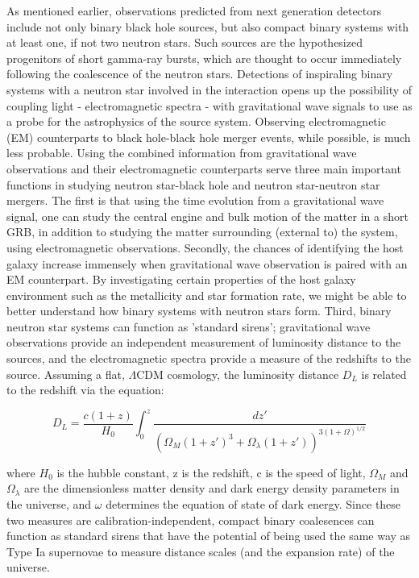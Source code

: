 \documentclass{article}
\begin{document}
As mentioned earlier, observations predicted from next generation detectors include not only binary black hole sources, but also compact binary systems with at least one, if not two neutron stars.  Such sources are the hypothesized progenitors of short gamma-ray bursts, which are thought to occur immediately following the coalescence of the neutron stars.  Detections of inspiraling binary systems with a neutron star involved in the interaction opens up the possibility of coupling light - electromagnetic spectra - with gravitational wave signals to use as a probe for the astrophysics of the source system.  Observing electromagnetic (EM) counterparts to black hole-black hole merger events, while possible, is much less probable.  Using the combined information from gravitational wave observations and their electromagnetic counterparts serve three main important functions in studying neutron star-black hole and neutron star-neutron star mergers.  The first is that using the time evolution from a gravitational wave signal, one can study the central engine and bulk motion of the matter in a short GRB, in addition to studying the matter surrounding (external to) the system, using electromagnetic observations.  Secondly, the chances of identifying the host galaxy increase immensely when gravitational wave observation is paired with an EM counterpart.  By investigating certain properties of the host galaxy environment such as the metallicity and star formation rate, we might be able to better understand how binary systems with neutron stars form.  Third, binary neutron star systems can function as 'standard sirens'; gravitational wave observations provide an independent measurement of luminosity distance to the sources, and the electromagnetic spectra provide a measure of the redshifts to the source.  Assuming a flat, $\Lambda$CDM cosmology, the luminosity distance $D_L$ is related to the redshift via the equation:

\begin{equation} D_L = \frac{c(1+z)}{H_0}\int_{0}^{z} \frac{dz'}{(\Omega_M(1+z')^3 + \Omega_{\lambda}(1+z'))^{3(1+\Omega)^{1/2}}} \end{equation}

where $H_0$ is the hubble constant, z is the redshift, c is the speed of light, $\Omega_M$ and $\Omega_{\lambda}$ are the dimensionless matter density and dark energy density parameters in the universe, and $\omega$ determines the equation of state of dark energy.  Since these two measures are calibration-independent, compact binary coalesences can function as standard sirens that have the potential of being used the same way as Type Ia supernovae to measure distance scales (and the expansion rate) of the universe.  
\end{document}
